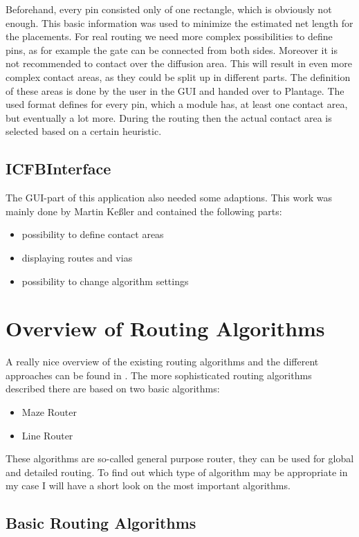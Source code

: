 Beforehand, every pin consisted only of one rectangle, which is obviously not enough. This basic information was used to minimize the estimated net length for the placements. For real routing we need more complex possibilities to define pins, as for example the gate can be connected from both sides. Moreover it is not recommended to contact over the diffusion area. This will result in even more complex contact areas, as they could be split up in different parts. The definition of these areas is done by the user in the GUI and handed over to Plantage. The used format defines for every pin, which a module has, at least one contact area, but eventually a lot more. During the routing then the actual contact area is selected based on a certain heuristic.

\subsection{ICFBInterface}
The GUI-part of this application also needed some adaptions. This work was mainly done by Martin Keßler and contained the following parts:

\begin{itemize}
\item possibility to define contact areas
\item displaying routes and vias
\item possibility to change algorithm settings
\end{itemize}	

\section{Overview of Routing Algorithms}
A really nice overview of the existing routing algorithms and the different approaches can be found in \cite[page 149 till 201]{springer:eda_analog_routing}. The more sophisticated routing algorithms described there are based on two basic algorithms:
\begin{itemize}
\item Maze Router
\item Line Router
\end{itemize}
These algorithms are so-called general purpose router, they can be used for global and detailed routing. To find out which type of algorithm may be appropriate in my case I will have a short look on the most important algorithms.

\subsection{Basic Routing Algorithms}
